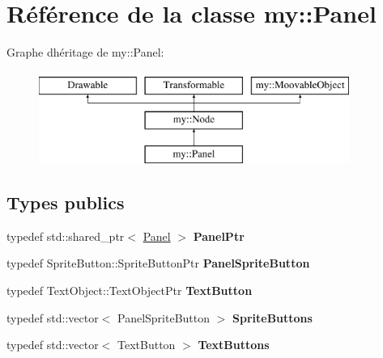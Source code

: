 \hypertarget{classmy_1_1Panel}{}\section{Référence de la classe my\+:\+:Panel}
\label{classmy_1_1Panel}
Graphe d\textquotesingle{}héritage de my\+:\+:Panel\+:\begin{figure}[H]
\begin{center}
\leavevmode
\includegraphics[height=3.000000cm]{classmy_1_1Panel}
\end{center}
\end{figure}
\subsection*{Types publics}
\begin{DoxyCompactItemize}
\item 
\mbox{\label{classmy_1_1Panel_a4d8b8e5938fc6636a86c827f9d0ca4c3}} 
typedef std\+::shared\+\_\+ptr$<$ \hyperlink{classmy_1_1Panel}{Panel} $>$ {\bfseries Panel\+Ptr}
\item 
\mbox{\label{classmy_1_1Panel_a564d9679b0bab4d97778142540ef34ea}} 
typedef Sprite\+Button\+::\+Sprite\+Button\+Ptr {\bfseries Panel\+Sprite\+Button}
\item 
\mbox{\label{classmy_1_1Panel_ab8c92a11eb9757509f10e9cd6119f68c}} 
typedef Text\+Object\+::\+Text\+Object\+Ptr {\bfseries Text\+Button}
\item 
\mbox{\label{classmy_1_1Panel_a8b61d17b51fc11dc34c446214ff959c3}} 
typedef std\+::vector$<$ Panel\+Sprite\+Button $>$ {\bfseries Sprite\+Buttons}
\item 
\mbox{\label{classmy_1_1Panel_aa1a364d3ab63a94e52527d3474e34d9e}} 
typedef std\+::vector$<$ Text\+Button $>$ {\bfseries Text\+Buttons}
\end{DoxyCompactItemize}
